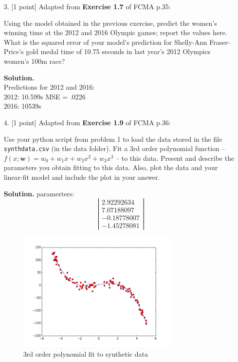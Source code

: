 \documentclass[10pt]{article}
\begin{document}
\begin{itemize}
\item[3.] [1 point]
Adapted from {\bf Exercise 1.7} of FCMA p.35:

Using the model obtained in the previous exercise, predict the women's winning time at the 2012 and 2016 Olympic games; report the values here.  What is the squared error of your model's prediction for Shelly-Ann Fraser-Price's gold medal time of 10.75 seconds in last year's 2012 Olympics women's 100m race?

{\bf Solution.} \\
Predictions for 2012 and 2016:\\
2012:  10.599s 			MSE = .0226\\
2016:  10539s\\


\item[4.] [1 point]
Adapted from {\bf Exercise 1.9} of FCMA p.36:

Use your python script from problem 1 to load the data stored in the file {\tt synthdata.csv} (in the data folder).  Fit a 3rd order polynomial function -- $f(x; \mathbf{w}) = w_0 + w_1 x + w_2 x^2 + w_3 x^3$ -- to this data.  
Present and describe the parameters you obtain fitting to this data.  Also, plot the data and your linear-fit model and include the plot in your answer.

{\bf Solution.} 
paramerters:
\[ \left|  \begin{array}{c}
2.92292634\\
7.07188097\\
-0.18778007\\
-1.45278081 \end{array} \right| \]

\begin{figure}[htb]
\begin{center}
\includegraphics[width=8cm]{synthdata_3order.png}
\caption{3rd order polynomial fit to synthetic data\label{fig:synth3rd}}
\end{center}
\end{figure}



\end{itemize}
\end{document}
